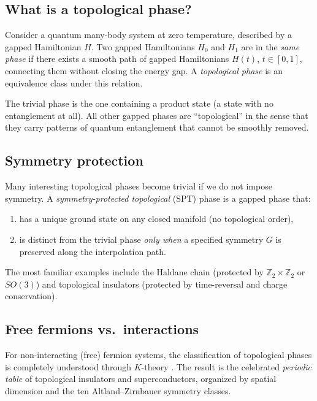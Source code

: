 \documentclass{SciPost}
\theoremstyle{definition}
\newcommand{\Zt}{\mathbb{Z}_2}
\begin{document}
\subsection{What is a topological phase?}

Consider a quantum many-body system at zero temperature, described by a gapped Hamiltonian $H$.
Two gapped Hamiltonians $H_0$ and $H_1$ are in the \emph{same phase} if there exists a smooth path of gapped Hamiltonians $H(t)$, $t\in[0,1]$, connecting them without closing the energy gap.
A \emph{topological phase} is an equivalence class under this relation.

The trivial phase is the one containing a product state (a state with no entanglement at all).
All other gapped phases are ``topological'' in the sense that they carry patterns of quantum entanglement that cannot be smoothly removed.

\subsection{Symmetry protection}

Many interesting topological phases become trivial if we do not impose symmetry.
A \emph{symmetry-protected topological} (SPT) phase is a gapped phase that:
\begin{enumerate}[label=(\roman*)]
    \item has a unique ground state on any closed manifold (no topological order),
    \item is distinct from the trivial phase \emph{only when} a specified symmetry $G$ is preserved along the interpolation path.
\end{enumerate}
The most familiar examples include the Haldane chain (protected by $\Zt \times \Zt$ or $SO(3)$) and topological insulators (protected by time-reversal and charge conservation).

\subsection{Free fermions vs.\ interactions}

For non-interacting (free) fermion systems, the classification of topological phases is completely understood through $K$-theory \cite{Kitaev2009, Ryu2010, Schnyder2008}.
The result is the celebrated \emph{periodic table} of topological insulators and superconductors, organized by spatial dimension and the ten Altland--Zirnbauer symmetry classes.
\end{document}
